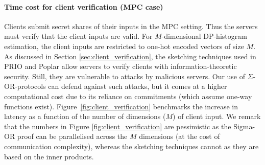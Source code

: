 \paragraph{Time cost for client verification (MPC case)}
Clients submit secret shares of their inputs in the MPC setting. Thus the servers must verify that the client inputs are valid. For $M$-dimensional DP-histogram estimation, the client inputs are restricted to one-hot encoded vectors of size $M$. As discussed in Section \ref{sec:client_verification}, the sketching techniques used in PRIO and Poplar allow servers to verify clients with information-theoretic security. Still, they are vulnerable to attacks by malicious servers. Our use of $\Sigma$-OR-protocols can defend against such attacks, but it comes at a higher computational cost due to its reliance on commitments (which assume one-way functions exist). 
Figure~\ref{fig:client_verification} benchmarks the increase in latency as a function of the number of dimensions ($M$) of client input. We remark that the numbers in Figure \ref{fig:client_verification} are pessimistic as the Sigma-OR proof can be parallelised across the $M$ dimensions (at the cost of communication complexity), whereas the sketching techniques cannot as they are based on the inner products.
